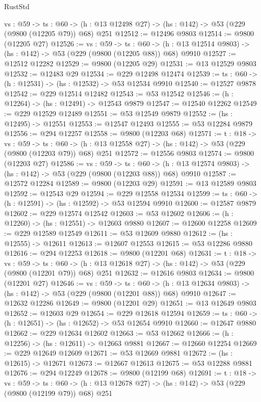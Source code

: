 \begin{lexlean}{RustStd}
\begin{coremodule}
  {vs : @59} ->
  {ts : @60} -> (h : @13 @12498 @27) -> (hs : @142) -> @53 (@229 (@9800 (@12205 @79)) @68) @251
@12512 := @12496 @9803
@12514 := @9800 (@12205 @27)
@12526 := {vs : @59} ->
  {ts : @60} -> (h : @13 @12514 @9803) -> (hs : @142) -> @53 (@229 (@9800 (@12205 @88)) @68) @9910
@12527 := @12512 @12282
@12529 := @9800 (@12205 @29)
@12531 := @13 @12529 @9803
@12532 := @12483 @29
@12534 := @229 @12498 @12474
@12539 := {ts : @60} -> (h : @12531) -> (hs : @12532) -> @53 @12534 @9910
@12540 := @12527 @9878
@12542 := @229 @12514 @12482
@12543 := @53 @12542
@12546 := (h : @12264) -> (hs : @12491) -> @12543 @9879
@12547 := @12540 @12262
@12549 := @229 @12529 @12489
@12551 := @53 @12549 @9879
@12552 := (hs : @12495) -> @12551
@12553 := @12547 @12493
@12555 := @53 @12284 @9879
@12556 := @294 @12257
@12558 := @9800 (@12203 @68)
@12571 := {t : @18} ->
  {vs : @59} ->
  {ts : @60} -> (h : @13 @12558 @27) -> (hs : @142) -> @53 (@229 (@9800 (@12203 @79)) @68) @251
@12572 := @12556 @9803
@12574 := @9800 (@12203 @27)
@12586 := {vs : @59} ->
  {ts : @60} -> (h : @13 @12574 @9803) -> (hs : @142) -> @53 (@229 (@9800 (@12203 @88)) @68) @9910
@12587 := @12572 @12284
@12589 := @9800 (@12203 @29)
@12591 := @13 @12589 @9803
@12592 := @12543 @29
@12594 := @229 @12558 @12534
@12599 := {ts : @60} -> (h : @12591) -> (hs : @12592) -> @53 @12594 @9910
@12600 := @12587 @9879
@12602 := @229 @12574 @12542
@12603 := @53 @12602
@12606 := (h : @12260) -> (hs : @12551) -> @12603 @9880
@12607 := @12600 @12258
@12609 := @229 @12589 @12549
@12611 := @53 @12609 @9880
@12612 := (hs : @12555) -> @12611
@12613 := @12607 @12553
@12615 := @53 @12286 @9880
@12616 := @294 @12253
@12618 := @9800 (@12201 @68)
@12631 := {t : @18} ->
  {vs : @59} ->
  {ts : @60} -> (h : @13 @12618 @27) -> (hs : @142) -> @53 (@229 (@9800 (@12201 @79)) @68) @251
@12632 := @12616 @9803
@12634 := @9800 (@12201 @27)
@12646 := {vs : @59} ->
  {ts : @60} -> (h : @13 @12634 @9803) -> (hs : @142) -> @53 (@229 (@9800 (@12201 @88)) @68) @9910
@12647 := @12632 @12286
@12649 := @9800 (@12201 @29)
@12651 := @13 @12649 @9803
@12652 := @12603 @29
@12654 := @229 @12618 @12594
@12659 := {ts : @60} -> (h : @12651) -> (hs : @12652) -> @53 @12654 @9910
@12660 := @12647 @9880
@12662 := @229 @12634 @12602
@12663 := @53 @12662
@12666 := (h : @12256) -> (hs : @12611) -> @12663 @9881
@12667 := @12660 @12254
@12669 := @229 @12649 @12609
@12671 := @53 @12669 @9881
@12672 := (hs : @12615) -> @12671
@12673 := @12667 @12613
@12675 := @53 @12288 @9881
@12676 := @294 @12249
@12678 := @9800 (@12199 @68)
@12691 := {t : @18} ->
  {vs : @59} ->
  {ts : @60} -> (h : @13 @12678 @27) -> (hs : @142) -> @53 (@229 (@9800 (@12199 @79)) @68) @251

\end{coremodule}
\end{lexlean}
